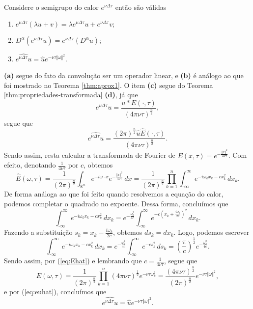 \documentclass[a4paper, 11pt]{book}
\theoremstyle{definition}
\newcommand{\m}{\text{-}}
\newcommand{\bR}{\mathbb{R}}
\begin{document}
\begin{pbox} \label{thm:propriedades-semi-grupo-calor}
    Considere o semigrupo do calor $e^{\nu\Delta\tau}$ então são válidas
    \begin{enumerate}[leftmargin=*, label=\textbf{(\alph*)}]
        \item $e^{\nu\Delta\tau}(\lambda u + v) = \lambda e^{\nu\Delta\tau} u + e^{\nu\Delta\tau} v$;
        \item $D^\alpha (e^{\nu\Delta\tau} u) = e^{\nu\Delta\tau} (D^\alpha u)$;
        \item $\widehat{e^{\nu\Delta \tau} u} = \hat u e^{-\nu \tau \Vert \omega \Vert^2}$.
    \end{enumerate}
\end{pbox} 
\begin{prf}
    \textbf{(a)} segue do fato da convolução ser um operador linear,
    e
    \textbf{(b)} é análogo ao que foi mostrado no Teorema \ref{thm:aprox1}.
    O item \textbf{(c)} segue do Teorema \ref{thm:propriedades-transformada} \textbf{(d)}, já que
    \[
        e^{\nu \Delta \tau} u = \frac{u * E(\cdot,\tau)}{(4\pi \nu \tau)^{\frac{n}{2}}},
    \]
    segue que
    \begin{equation} \label{eq:euhat}
        \widehat{e^{\nu \Delta \tau} u} = \frac{(2\pi)^{\frac{n}{2}} \hat u \hat E(\cdot,\tau)}{(4\pi\nu\tau)^{\frac{n}{2}}}.
    \end{equation}
    Sendo assim, resta calcular a transformada de Fourier de $E(x,\tau) = e^{-\frac{\Vert x \Vert^2}{4\nu\tau}}$.
    Com efeito, denotando $\frac{1}{4\nu\tau}$ por $c$, obtemos
    \begin{equation} \label{eq:Ehat}
        \hat{E}(\omega,\tau) = \frac{1}{(2\pi)^{\frac{n}{2}}}\int_{\bR^n} e^{-i\omega\cdot x} e^{-\frac{\Vert x \Vert^2}{4\nu\tau}} \,dx = \frac{1}{(2\pi)^{\frac{n}{2}}} \prod_{k=1}^n \int_{\m\infty}^\infty e^{-i\omega_k x_k - cx_k^2} \,dx_k.
    \end{equation}
    De forma análoga ao que foi feito quando resolvemos a equação do calor, podemos completar o quadrado no expoente. Dessa forma, concluímos que
    \[
        \int_{\m\infty}^\infty e^{-i\omega_k x_k - cx_k^2} \,dx_k = e^{-\frac{\omega_k^2}{4c}}\int_{\m\infty}^\infty e^{-c\left( x_k + \frac{i\omega_k}{2c} \right)^2} \,dx_k. 
    \]
    Fazendo a substituição $s_k = x_k - \frac{i\omega_k}{2c}$, obtemos $ds_k = dx_k$. Logo, podemos escrever
    \[
        \int_{\m\infty}^\infty e^{-i\omega_k x_k - cx_k^2} \,dx_k = e^{-\frac{\omega_k^2}{4c}}\int_{\m\infty}^\infty e^{-cs_k^2} \,ds_k = \left( \frac{\pi}{c} \right)^{\frac{1}{2}} e^{-\frac{\omega_k^2}{4c}}. 
    \]
    Sendo assim, por (\ref{eq:Ehat}) e lembrando que $c = \frac{1}{4\nu\tau}$, segue que
    \[
        \hat E(\omega,\tau) = \frac{1}{(2\pi)^{\frac{n}{2}}} \prod_{k=1}^n (4\pi \nu \tau)^{\frac{1}{2}} e^{-\nu \tau \omega_k^2} = \frac{(4\pi\nu\tau)^{\frac{n}{2}}}{(2\pi)^{\frac{n}{2}}} e^{-\nu\tau \Vert \omega \Vert^2},
    \]
    e por (\ref{eq:euhat}), concluímos que
    \[
        \widehat{e^{\nu\Delta \tau} u} = \hat u e^{-\nu\tau \Vert \omega \Vert^2}.
    \]
\end{prf}
\end{document}
